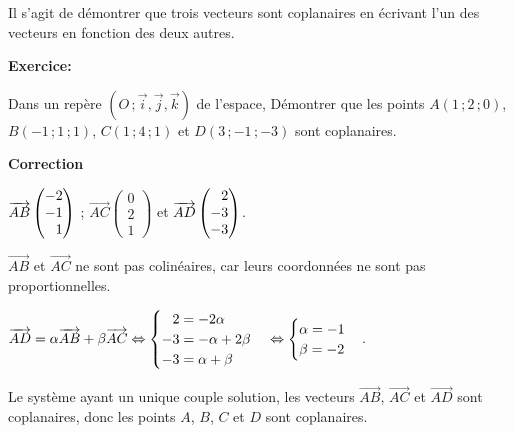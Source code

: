 \documentclass{cornouaille}
\begin{document}
\begin{methode}

  Il s'agit de démontrer que trois vecteurs sont coplanaires en
  écrivant l'un des vecteurs en fonction des deux autres.

  

\textbf{Exercice:}

 

  Dans un repère $(O\,;\vec{i},\vec{j},\vec{k})$ de l'espace, Démontrer
  que les points $A(1\,;2\,;0)$, $B(-1\,;1\,;1)$, $C(1\,;4\,;1)$ et $D(3\,;-1\,;-3)$
  sont coplanaires.

  

\textbf{Correction}



  $\overrightarrow{AB} 
  \begin{pmatrix} 
    -2\\
    -1\\
    \hphantom{-}1
  \end{pmatrix}$ ; $\overrightarrow{AC} \begin{pmatrix} 0\\2\\1
  \end{pmatrix}$ et $\overrightarrow{AD} \begin{pmatrix} \hphantom{-}2\\-3\\-3
  \end{pmatrix}$.

  $\overrightarrow{AB}$ et $\overrightarrow{AC}$ ne sont pas
  colinéaires, car leurs coordonnées ne sont pas proportionnelles.

  $\overrightarrow{AD}=\alpha\overrightarrow{AB}+\beta\overrightarrow{AC}\Leftrightarrow%
  \begin{cases}
    \hphantom{-}2=-2\alpha\\
    -3=-\alpha+2\beta\\
    -3=\alpha+\beta
  \end{cases}\Leftrightarrow
  \begin{cases}
    \alpha=-1\\
    \beta=-2
  \end{cases}$.

  Le système ayant un unique couple solution, les vecteurs
  $\overrightarrow{AB}$, $\overrightarrow{AC}$ et
  $\overrightarrow{AD}$ sont coplanaires, donc les points $A$, $B$,
  $C$ et $D$ sont coplanaires.
\end{methode}
\end{document}
